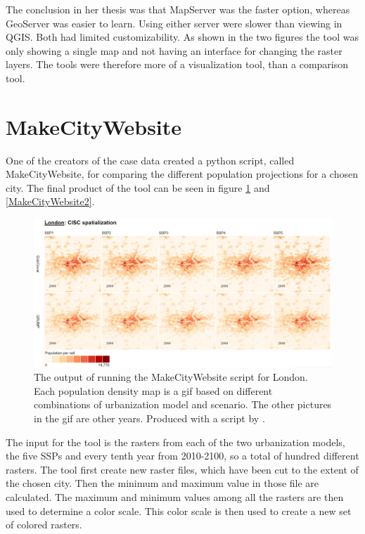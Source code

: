 The conclusion in her thesis was that MapServer was the faster option, whereas GeoServer was easier to learn. Using either server were slower than viewing in QGIS. Both had limited customizability. As shown in the two figures the tool was only showing a single map and not having an interface for changing the raster layers. The tools were therefore more of a visualization tool, than a comparison tool.



\section{MakeCityWebsite}\label{MakeCitySection}
One of the creators of the case data created a python script, called MakeCityWebsite, for comparing the different population projections for a chosen city.  The final product of the tool can be seen in figure \ref{MakeCityWebsite1} and \ref{MakeCityWebsite2}. 

\begin{figure} [H]
	\centering
	\includegraphics[width=1\textwidth]{Pictures/MakeCityWebsite1}
	\caption{The output of running the MakeCityWebsite script for London. Each population density map is a gif based on different combinations of urbanization model and scenario. The other pictures in the gif are other years. Produced with a script by \citet{MakeCityWebsite}.}
	\label{MakeCityWebsite1}
\end{figure}

The input for the tool is the rasters from each of the two urbanization models, the five SSPs and every tenth year from 2010-2100, so a total of hundred different rasters.
The tool first create new raster files, which have been cut to the extent of the chosen city. Then the minimum and maximum value in those file are calculated. The maximum and minimum values among all the rasters are then used to determine a color scale. This color scale is then used to create a new set of colored rasters.

